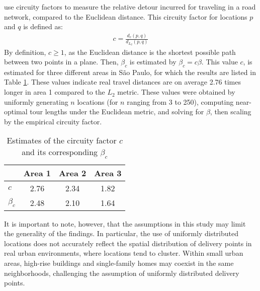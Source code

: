\citet{merchan2019empirical} use circuity factors to measure the relative detour incurred for traveling in a road network, compared to the Euclidean distance.
This circuity factor for locations $p$ and $q$ is defined as:
\begin{align}
	c = \frac{d_{c}(p,q)}{d_{L_{2}}(p,q)}
	\label{eq:circuity}
\end{align}
By definition, $c \geq 1$, as the Euclidean distance is the shortest possible path between two points in a plane.
Then, $\beta_c$ is estimated by $\beta_c=c\beta$. This value $c$, is estimated for three different areas in São Paulo, for which the results are listed in Table
\ref{tab:beta-merchan}.
These values indicate real travel distances are on average 2.76 times longer in area 1 compared to the $L_2$ metric.
These values were obtained by uniformly generating $n$ locations (for $n$ ranging from 3 to 250), computing near-optimal tour lengths under the Euclidean metric,
and solving for $\beta$, then scaling by the empirical circuity factor.
\begin{table}[H]
	\centering
	\caption{Estimates of the circuity factor $c$ and its corresponding $\beta_c$ \citep{merchan2019empirical}}
	\label{tab:beta-merchan}
	\begin{tabular}{lccc}
		\toprule
		          & Area 1 & Area 2 & Area 3 \\
		\midrule
		$c$       & 2.76   & 2.34   & 1.82   \\
		$\beta_c$ & 2.48   & 2.10   & 1.64   \\
		\bottomrule
	\end{tabular}
\end{table}
It is important to note, however, that the assumptions in this study may limit the generality of the findings.
In particular, the use of uniformly distributed locations does not accurately reflect the spatial distribution of delivery points in real urban environments,
where locations tend to cluster.
Within small urban areas, high-rise buildings and single-family homes may coexist in the same neighborhoods, challenging the assumption of uniformly distributed
delivery points.
